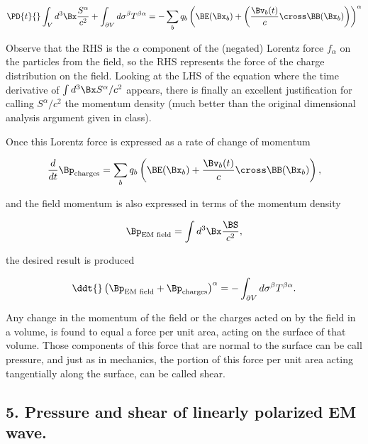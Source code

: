 \begin{equation}\label{eqn:relativisticElectrodynamicsPS6P1:270}
\PD{t}{} \int_V d^3 \Bx \frac{S^\alpha}{c^2} 
+ 
\int_{\partial V} d \sigma^\beta T^{\beta \alpha}
= -
\sum_b q_b \left( \BE(\Bx_b) + \left( \frac{\Bv_b(t)}{c} \cross \BB(\Bx_b) \right) \right)^\alpha 
\end{equation}

Observe that the RHS is the $\alpha$ component of the (negated) Lorentz force $f_\alpha$ on the particles from the field, so the RHS represents the force of the charge distribution on the field.  Looking at the LHS of the equation where the time derivative of $\int d^3\Bx S^\alpha/c^2$ appears, there is finally an excellent justification for calling $S^\alpha/c^2$ the momentum density (much better than the original dimensional analysis argument given in class).

Once this Lorentz force is expressed as a rate of change of momentum

\begin{equation}\label{eqn:relativisticElectrodynamicsPS6P1:290}
\frac{d}{dt} \Bp_{\text{charges}} = \sum_b q_b \left( \BE(\Bx_b) + \frac{\Bv_b(t)}{c} \cross \BB(\Bx_b) \right),
\end{equation}

and the field momentum is also expressed in terms of the momentum density

\begin{equation}\label{eqn:relativisticElectrodynamicsPS6P1:310}
\Bp_{\text{EM field}} = \int d^3 \Bx \frac{\BS}{c^2},
\end{equation}

the desired result is produced

\begin{equation}\label{eqn:relativisticElectrodynamicsPS6P1:330}
\ddt{} \left( \Bp_{\text{EM field}} + \Bp_{\text{charges}} \right)^\alpha = -\int_{\partial V} d \sigma^\beta T^{\beta \alpha}.
\end{equation}

Any change in the momentum of the field or the charges acted on by the field in a volume, is found to equal a force per unit area, acting on the surface of that volume.  Those components of this force that are normal to the surface can be call pressure, and just as in mechanics, the portion of this force per unit area acting tangentially along the surface, can be called shear.

\subsection{5. Pressure and shear of linearly polarized EM wave.}

